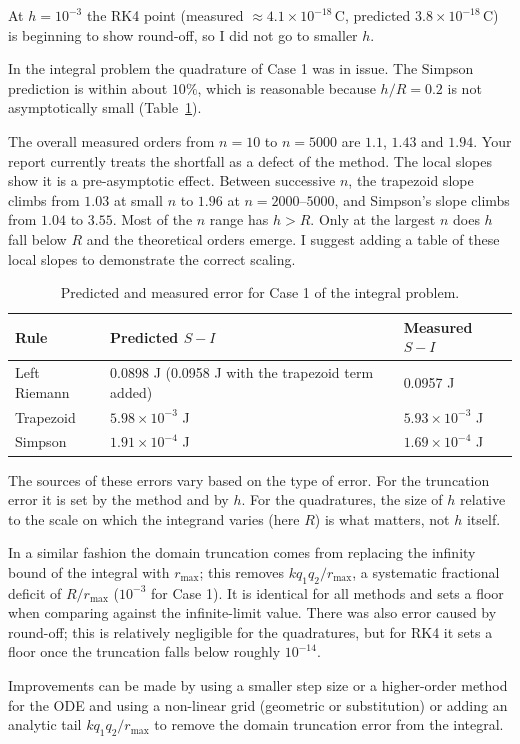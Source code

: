 \documentclass[11pt]{article}
\newcommand{\rmax}{r_{\max}}
\begin{document}
At $h = 10^{-3}$ the RK4 point (measured $\approx 4.1\times10^{-18}$\,C, predicted $3.8\times10^{-18}$\,C) is beginning to show round-off, so I did not go to smaller $h$.

In the integral problem the quadrature of Case 1 was in issue. The Simpson prediction is within about $10\%$, which is reasonable because $h/R = 0.2$ is not asymptotically small (Table~\ref{tab:pred}).

The overall measured orders from $n = 10$ to $n = 5000$ are $1.1$, $1.43$ and $1.94$. Your report currently treats the shortfall as a defect of the method. The local slopes show it is a pre-asymptotic effect. Between successive $n$, the trapezoid slope climbs from $1.03$ at small $n$ to $1.96$ at $n = 2000$--$5000$, and Simpson's slope climbs from $1.04$ to $3.55$. Most of the $n$ range has $h > R$. Only at the largest $n$ does $h$ fall below $R$ and the theoretical orders emerge. I suggest adding a table of these local slopes to demonstrate the correct scaling.

\begin{table}[htbp]
  \centering
  \caption{Predicted and measured error for Case 1 of the integral problem.}
  \label{tab:pred}
  \begin{tabular}{l l l}
    \toprule
    Rule & Predicted $S - I$ & Measured $S - I$ \\
    \midrule
    Left Riemann & 0.0898 J (0.0958 J with the trapezoid term added) & 0.0957 J \\
    Trapezoid    & $5.98\times10^{-3}$ J & $5.93\times10^{-3}$ J \\
    Simpson      & $1.91\times10^{-4}$ J & $1.69\times10^{-4}$ J \\
    \bottomrule
  \end{tabular}
\end{table}

The sources of these errors vary based on the type of error. For the truncation error it is set by the method and by $h$. For the quadratures, the size of $h$ relative to the scale on which the integrand varies (here $R$) is what matters, not $h$ itself.

In a similar fashion the domain truncation comes from replacing the infinity bound of the integral with $\rmax$; this removes $kq_1q_2/\rmax$, a systematic fractional deficit of $R/\rmax$ ($10^{-3}$ for Case 1). It is identical for all methods and sets a floor when comparing against the infinite-limit value. There was also error caused by round-off; this is relatively negligible for the quadratures, but for RK4 it sets a floor once the truncation falls below roughly $10^{-14}$.

Improvements can be made by using a smaller step size or a higher-order method for the ODE and using a non-linear grid (geometric or substitution) or adding an analytic tail $kq_1q_2/\rmax$ to remove the domain truncation error from the integral.
\end{document}
